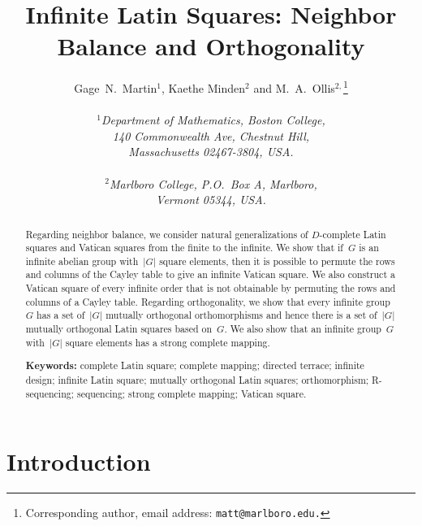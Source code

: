 \documentclass[12pt,a4paper]{article}
\begin{document}
\title{Infinite Latin Squares: Neighbor Balance and Orthogonality}

\author{Gage~N.~Martin$^{1}$, Kaethe Minden$^2$ and M.~A.~Ollis$^{2,}$\footnote{Corresponding author, email address: \texttt{matt@marlboro.edu.}}   \\
              \\
              {\it ${}^1$Department of Mathematics, Boston College,} \\
               {\it 140 Commonwealth Ave, Chestnut Hill,  } \\
              {\it  Massachusetts 02467-3804, USA.}
              \\
              \\
              {\it ${}^2$Marlboro College, P.O.~Box A, Marlboro,} \\    
              {\it Vermont 05344, USA.}  }
              

\maketitle



\begin{abstract}
Regarding neighbor balance, we consider natural generalizations of $D$-complete Latin squares and Vatican squares from the finite to the infinite.   We show that if~$G$ is an infinite abelian group with~$|G|$ square elements, then it is possible to permute the rows and columns of the Cayley table to give an infinite Vatican square.  We also construct a Vatican square of every infinite order that is not obtainable by permuting the rows and columns of a Cayley table.  Regarding orthogonality, we show that every infinite group~$G$ has a set of~$|G|$ mutually orthogonal orthomorphisms and hence there is a set of~$|G|$ mutually orthogonal Latin squares based on~$G$.  We also show that an infinite group~$G$ with~$|G|$ square elements has a strong complete mapping.


\vspace{3mm}
\noindent
{\bf Keywords:} complete Latin square; complete mapping; directed terrace; infinite design; infinite Latin square; mutually orthogonal Latin squares; orthomorphism; R-sequencing; sequencing; strong complete mapping; Vatican square.
\end{abstract}



\section{Introduction}\label{sec:intro}
\end{document}
